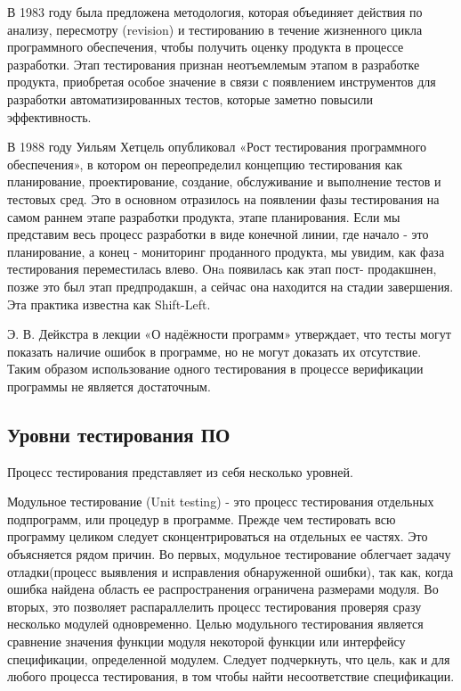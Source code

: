 В 1983 году была предложена методология, которая объединяет действия по анализу, пересмотру 
(revision) и тестированию в течение жизненного цикла программного обеспечения, чтобы получить 
оценку продукта в процессе разработки. Этап тестирования признан неотъемлемым этапом в 
разработке продукта, приобретая особое значение в связи с появлением инструментов для разработки 
автоматизированных тестов, которые заметно повысили эффективность.

В 1988 году Уильям Хетцель опубликовал «Рост тестирования программного обеспечения»\cite{Hetzel}, в котором 
он переопределил концепцию тестирования как планирование, проектирование, создание, обслуживание 
и выполнение тестов и тестовых сред. Это  в основном отразилось на появлении фазы тестирования 
на самом раннем этапе разработки продукта, этапе планирования. Если мы представим весь процесс 
разработки в виде конечной линии, где начало - это планирование, а конец - мониторинг проданного 
продукта, мы увидим, как фаза тестирования переместилась влево. Онa появилась как этап пост-
продакшнен, позже это был этап предпродакшн, а сейчас она находится на стадии завершения. Эта 
практика известна как Shift-Left.

Э. В. Дейкстра в лекции «О надёжности программ» утверждает, что тесты могут показать наличие 
ошибок в программе, но не могут доказать их отсутствие\autocite{Dijkstra}. Таким образом 
использование одного тестирования в процессе верификации программы не является достаточным. 

\subsection{Уровни тестирования ПО}
Процесс тестирования представляет из себя несколько уровней. 

Модульное тестирование (Unit testing) - это процесс тестирования отдельных подпрограмм, или 
процедур в программе. Прежде чем тестировать всю программу целиком следует сконцентрироваться 
на отдельных ее частях. Это объясняется рядом причин. Во первых, модульное тестирование облегчает задачу
отладки(процесс выявления и исправления обнаруженной ошибки), так как, когда ошибка найдена 
область ее распространения ограничена размерами модуля. Во вторых, это позволяет распараллелить 
процесс тестирования проверяя сразу несколько модулей одновременно. Целью модульного тестирования
является сравнение значения функции модуля некоторой функции или интерфейсу спецификации, 
определенной модулем. Следует подчеркнуть, что цель, как и для любого процесса тестирования, в том
чтобы найти несоответствие спецификации. 

